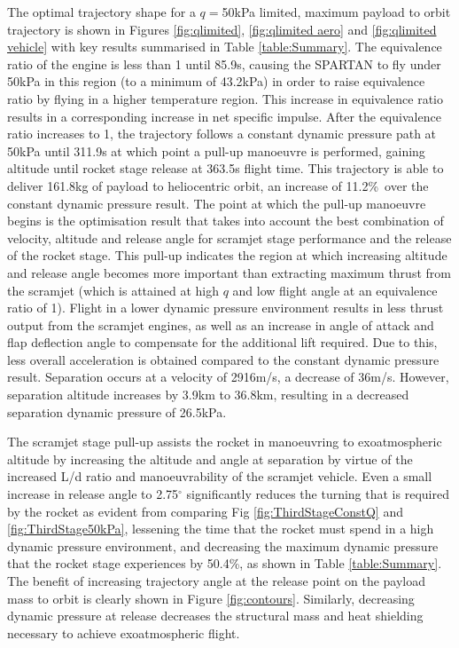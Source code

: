 \documentclass[]{aiaa-tc}
\newcommand{\PayloadImprovement}{11.2\%}
\newcommand{\qDecrease}{50.4\%}
\newcommand{\PayloadToOrbitFiftykPa}{161.8}
\newcommand{\SeparationAltFiftykPa}{36.8}
\newcommand{\SeparationvFiftykPa}{2916}
\newcommand{\SeparationAngleFiftykPa}{2.75}
\newcommand{\SeparationqFiftykPa}{26.5}
\newcommand{\FlightTimeFiftykPa}{363.5}
\begin{document}
 
The optimal trajectory shape for a $q=$50kPa limited, maximum payload to orbit trajectory is shown in Figures \ref{fig:qlimited}, \ref{fig:qlimited aero} and \ref{fig:qlimited vehicle} with key results summarised in Table \ref{table:Summary}. 
The equivalence ratio of the engine is less than 1 until 85.9s, causing the SPARTAN to fly under 50kPa in this region (to a minimum of 43.2kPa) in order to raise equivalence ratio by flying in a higher temperature region. This increase in equivalence ratio results in a corresponding increase in net specific impulse.
 After the equivalence ratio increases to 1, the trajectory follows a constant dynamic pressure path at 50kPa until 311.9s at which point a pull-up manoeuvre is performed, gaining altitude until rocket stage release at \FlightTimeFiftykPa s flight time. 
 This trajectory is able to deliver \PayloadToOrbitFiftykPa kg of payload to heliocentric orbit, an increase of \PayloadImprovement\ over the constant dynamic pressure result. The point at which the pull-up manoeuvre begins is the optimisation result that takes into account the best combination of velocity, altitude and release angle for scramjet stage performance and the release of the rocket stage. This pull-up indicates the region at which increasing altitude and release angle becomes more important than extracting maximum thrust from the scramjet (which is attained at high $q$ and low flight angle at an equivalence ratio of 1).
 Flight in a lower dynamic pressure environment results in less thrust output from the scramjet engines, as well as an increase in angle of attack and flap deflection angle to compensate for the additional lift required. Due to this, less overall acceleration is obtained compared to the constant dynamic pressure result. Separation occurs at a velocity of \SeparationvFiftykPa m/s, a decrease of 36m/s. However, separation altitude increases by 3.9km to \SeparationAltFiftykPa km, resulting in a decreased separation dynamic pressure of \SeparationqFiftykPa kPa. 

The scramjet stage pull-up assists the rocket in manoeuvring to exoatmospheric altitude by increasing the altitude and angle at separation by virtue of the increased L/d ratio and manoeuvrability of the scramjet vehicle. Even a small increase in release angle to \SeparationAngleFiftykPa $^\circ$ significantly reduces the turning that is required by the rocket as evident from comparing Fig \ref{fig:ThirdStageConstQ} and \ref{fig:ThirdStage50kPa}, lessening the time that the rocket must spend in a high dynamic pressure environment, and decreasing the maximum dynamic pressure that the rocket stage experiences by \qDecrease, as shown in Table \ref{table:Summary}. 
The benefit of increasing trajectory angle at the release point on the payload mass to orbit is clearly shown in Figure \ref{fig:contours}.
Similarly, decreasing dynamic pressure at release decreases the structural mass and heat shielding necessary to achieve exoatmospheric flight. 
\end{document}
